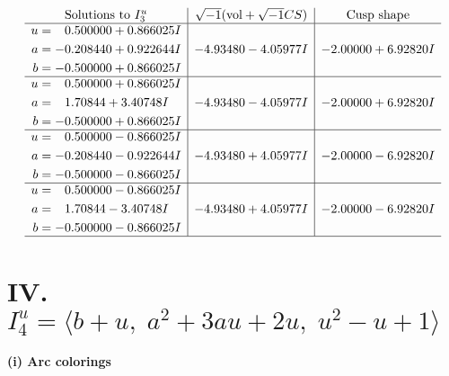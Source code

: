 \documentclass[1p]{elsarticle_modified}
\theoremstyle{definition}
\newcommand{\I}{\sqrt{-1}}
\begin{document}
$$\begin{array}{c|c|c}  
\text{Solutions to }I^u_{3}& \I (\text{vol} + \sqrt{-1}CS) & \text{Cusp shape}\\
 \hline 
\begin{aligned}
u &= \phantom{-}0.500000 + 0.866025 I \\
a &= -0.208440 + 0.922644 I \\
b &= -0.500000 + 0.866025 I\end{aligned}
 & -4.93480 - 4.05977 I & -2.00000 + 6.92820 I \\ \hline\begin{aligned}
u &= \phantom{-}0.500000 + 0.866025 I \\
a &= \phantom{-}1.70844 + 3.40748 I \\
b &= -0.500000 + 0.866025 I\end{aligned}
 & -4.93480 - 4.05977 I & -2.00000 + 6.92820 I \\ \hline\begin{aligned}
u &= \phantom{-}0.500000 - 0.866025 I \\
a &= -0.208440 - 0.922644 I \\
b &= -0.500000 - 0.866025 I\end{aligned}
 & -4.93480 + 4.05977 I & -2.00000 - 6.92820 I \\ \hline\begin{aligned}
u &= \phantom{-}0.500000 - 0.866025 I \\
a &= \phantom{-}1.70844 - 3.40748 I \\
b &= -0.500000 - 0.866025 I\end{aligned}
 & -4.93480 + 4.05977 I & -2.00000 - 6.92820 I\\
 \hline 
 \end{array}$$\newpage\newpage\renewcommand{\arraystretch}{1}
\centering \section*{IV. $I^u_{4}= \langle b+u,\;a^2+3 a u+2 u,\;u^2- u+1 \rangle$}
\flushleft \textbf{(i) Arc colorings}\\
\end{document}
